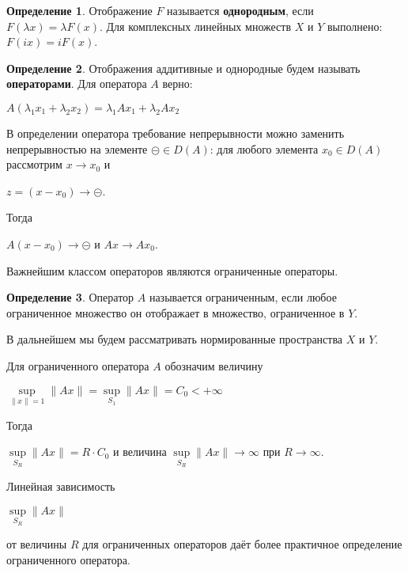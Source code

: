 \documentclass[12pt,a4paper,titlepage, oneside]{book}
\theoremstyle{definition}
\newtheorem*{definition}{Определение}
\theoremstyle{plain}
\theoremstyle{remark}
\theoremstyle{remark}
\theoremstyle{remark}
\theoremstyle{remark}
\theoremstyle{plain}
\theoremstyle{plain}
\begin{document}
\begin{definition} Отображение $F$ называется \textbf{однородным}, если $F(\lambda x)=\lambda F(x)$. Для комплексных линейных множеств $X$ и $Y$ выполнено: $F(ix)=iF(x)$.
\end{definition}

\begin{definition} Отображения аддитивные и однородные будем называть \textbf{операторами}. Для оператора $A$ верно:

\begin{center}
	$A(\lambda_1x_1+\lambda_2x_2)=\lambda_1Ax_1+\lambda_2Ax_2$
\end{center}

\end{definition}

В определении оператора требование непрерывности можно заменить непрерывностью на элементе $\circleddash \in D(A)$: для любого элемента $x_0\in D(A)$ рассмотрим $x \to x_0$ и 
\begin{center}
$z=(x-x_0)\to \circleddash$.
\end{center}
Тогда 
\begin{center}
$A(x-x_0)\to \circleddash$ и $Ax \to Ax_0$.
\end{center}
 
Важнейшим классом операторов являются ограниченные операторы.

\begin{definition} Оператор $A$ называется ограниченным, если любое ограниченное множество он отображает в множество, ограниченное в $Y$.
\end{definition}

В дальнейшем мы будем рассматривать нормированные пространства $X$ и $Y$.

Для ограниченного оператора $A$  обозначим величину 
\begin{center}
$\underset{\parallel x\parallel=1}{\sup}\parallel Ax \parallel =\underset{S_1}{\sup}\parallel Ax \parallel =C_0<+\infty$
\end{center}

Тогда
\begin{center}
$\underset{S_R}{\sup}\parallel Ax \parallel=R\cdot C_0$ 
и величина 
$\underset{S_R}{\sup}\parallel Ax \parallel\to\infty $ 
при $R\to\infty$.
\end{center}
Линейная зависимость
\begin{center}
$\underset{S_R}{\sup}\parallel Ax \parallel$ 
\end{center}
от величины $R$ для ограниченных операторов даёт более практичное определение ограниченного оператора.
\end{document}
